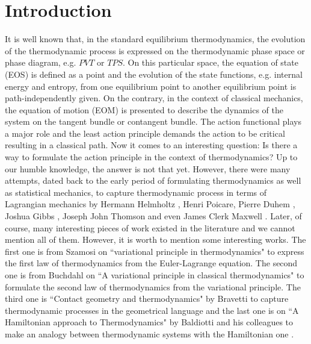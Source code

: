 \documentclass[12pt]{article}
\numberwithin{equation}{section}
\theoremstyle{remark}
\theoremstyle{definition}
\begin{document}
	\section{Introduction}\label{S1}
	It is well known that, in the standard equilibrium thermodynamics, the evolution of the thermodynamic process is expressed on the thermodynamic phase space or phase diagram, e.g. $PVT$ or $TPS$. On this particular space, the equation of state (EOS) is defined as a point and the evolution of the state functions, e.g. internal energy and entropy, from one equilibrium point to another equilibrium point is path-independently given. On the contrary, in the context of classical mechanics, the equation of motion (EOM) is presented to describe the dynamics of the system on the tangent bundle or contangent bundle. The action functional plays a major role and the least action principle demands the action to be critical resulting in a classical path. Now it comes to an interesting question: Is there a way to formulate the action principle in the context of thermodynamics? Up to our humble knowledge, the answer is not that yet. However, there were many attempts, dated back to the early period of formulating thermodynamics as well as statistical mechanics, to capture thermodynamic process in terms of Lagrangian mechanics by Hermann Helmholtz \cite{Helm1,Helm2}, Henri Poicare, Pierre Duhem \cite{D1,D2,D3,D4,D5}, Joshua Gibbs \cite{Gibbs1,Gibbs2,Gibbs3}, Joseph John Thomson \cite{Thomson} and even James Clerk Maxwell \cite{M1,M2}. Later, of course, many interesting pieces of work existed in the literature and we cannot mention all of them. However, it is worth to mention some interesting works. The first one is from Szamosi on ``variational principle in thermodynamics" \cite{GS} to express the first law of thermodynamics from the Euler-Lagrange equation. The second one is from Buchdahl on ``A variational principle in classical thermodynamics" \cite{B} to formulate the second law of thermodynamics from the variational principle. The third one is ``Contact geometry and thermodynamics" by Bravetti \cite{Bravetti} to capture thermodynamic processes in the geometrical language and the last one is on ``A Hamiltonian approach to Thermodynamics" by Baldiotti and his colleagues to make an analogy between thermodynamic systems with the Hamiltonian one \cite{Baldiotti}.
 \\
 \\
\end{document}

